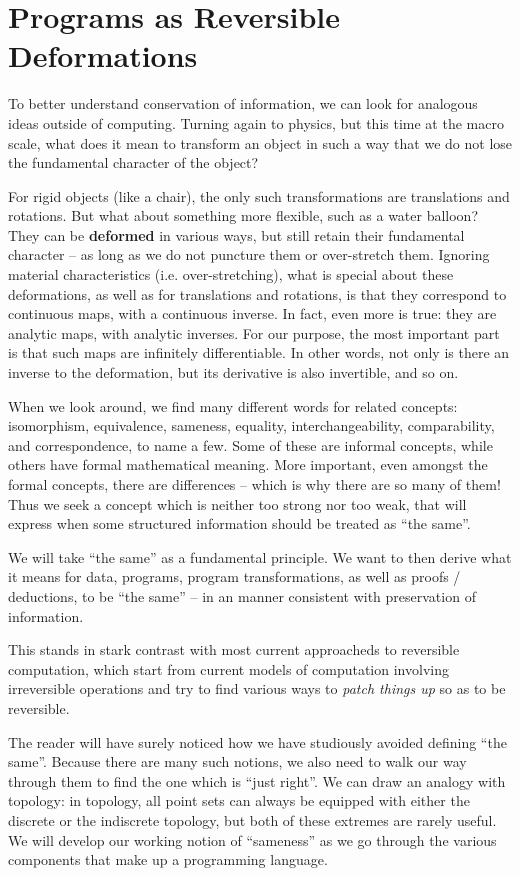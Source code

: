 \documentclass{article}
\begin{document}
\section{Programs as Reversible Deformations} 

To better understand conservation of information, we can look
for analogous ideas outside of computing. Turning again to physics,
but this time at the macro scale, what does it mean to transform an
object in such a way that we do not lose the fundamental character
of the object?

For rigid objects (like a chair), the only such transformations are
translations and rotations. But what about something more flexible,
such as a water balloon?  They can be \textbf{deformed} in various ways,
but still retain their fundamental character -- as long as we do not
puncture them or over-stretch them. Ignoring material characteristics
(i.e. over-stretching), what is special about these deformations, as well
as for translations and rotations, is that they correspond to
continuous maps, with a continuous inverse. In fact, even more is
true: they are analytic maps, with analytic inverses. For our purpose,
the most important part is that such maps are infinitely differentiable.
In other words, not only is there an inverse to the deformation, but
its derivative is also invertible, and so on.

When we look around, we find many different words for related
concepts: isomorphism, equivalence, sameness, equality, interchangeability,
comparability, and correspondence, to name a few. Some of these
are informal concepts, while others have formal mathematical meaning.
More important, even amongst the formal concepts, there are differences
-- which is why there are so many of them! Thus we seek a concept
which is neither too strong nor too weak, that will express when
some structured information should be treated as ``the same''.

We will take ``the same'' as a fundamental principle. We want
to then derive what it means for data, programs, program
transformations, as well as proofs / deductions, to be ``the
same'' -- in an manner consistent with preservation of 
information.

This stands in stark contrast with most current approacheds to
reversible computation, which start from current models of
computation involving irreversible operations and try to find
various ways to \emph{patch things up} so as to be reversible.

The reader will have surely noticed how we have studiously avoided
defining ``the same''. Because there are many such notions, we
also need to walk our way through them to find the one which is
``just right''. We can draw an analogy with topology: in topology,
all point sets can always be equipped with either the discrete or
the indiscrete topology, but both of these extremes are rarely
useful. We will develop our working notion of ``sameness''
as we go through the various components that make up a
programming language.
\end{document}
